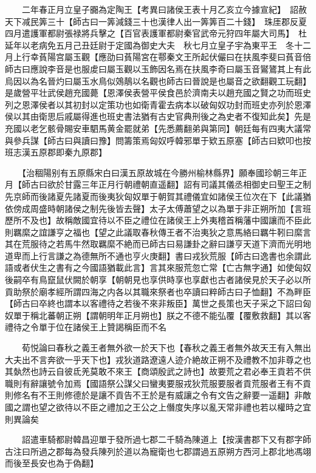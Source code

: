 　　二年春正月立皇子嚻為定陶王【考異曰諸侯王表十月乙亥立今據宣紀】　詔赦天下减民筭三十【師古曰一筭減錢三十也漢律人出一筭筭百二十錢】　珠厓郡反夏四月遣護軍都尉張禄將兵擊之【百官表護軍都尉秦官武帝元狩四年屬大司馬】　杜延年以老病免五月己丑廷尉于定國為御史大夫　秋七月立皇子宇為東平王　冬十二月上行幸萯陽宫屬玉觀【應劭曰萯陽宮在鄠秦文王所起伏儼曰在扶風李斐曰萯音倍師古曰應說李音是也服䖍曰屬玉觀以玉飾因名焉在扶風李奇曰屬玉音鸑鷟其上有此烏因以為名晉灼曰屬玉水鳥似鵁鶄以名觀也師古曰晉說是也屬音之欲翻觀工玩翻】　是歲營平壮武侯趙充國薨【恩澤侯表營平侯食邑於濟南夫以趙充國之賢之功而班史列之恩澤侯者以其初封以定策功也如衛青霍去病本以破匈奴功封而班史亦列於恩澤侯以其由衛思后戚屬得進也班史書法猶有古史官典刑後之為史者不復知此矣】先是充國以老乞骸骨賜安車駟馬黄金罷就弟【先悉薦翻弟與第同】朝廷每有四夷大議常與參兵謀【師古曰與讀曰豫】問籌策焉匈奴呼韓邪單于欵五原塞【師古曰欵叩也按班志漢五原郡即秦九原郡】

　　【治稒陽别有五原縣宋白曰漢五原故城在今勝州榆林縣界】願奉國珍朝三年正月【師古曰欲於甘露三年正月行朝禮朝直遥翻】詔有司議其儀丞相御史曰聖王之制先京師而後諸夏先諸夏而後夷狄匈奴單于朝賀其禮儀宜如諸侯王位次在下【此議猶依傍成周盛時朝諸侯之制先後皆去聲】太子太傅蕭望之以為單于非正朔所加【言班歷所不及也】故稱敵國宜待以不臣之禮位在諸侯王上外夷稽首稱藩中國讓而不臣此則羈縻之誼謙亨之福也【望之此議取春秋傳王者不治夷狄之意馬絡曰羈牛靷曰縻言其在荒服待之若馬牛然取羈縻不絶而已師古曰易謙卦之辭曰謙亨天道下濟而光明地道卑而上行言謙之為德無所不通也亨火庚翻】書曰戎狄荒服【師古曰逸書也余謂此語或者伏生之書有之今國語猶載此言】言其來服荒忽亡常【亡古無字通】如使匈奴後嗣卒有鳥竄鼠伏闕於朝享【朝朝見也享供時享也享獻也古者諸侯見於天子必以所貢助祭於廟孝經所謂四海之内各以其職來祭者也卒讀曰粹師古曰子恤翻】不為畔臣【師古曰卒終也謂本以客禮待之若後不來非叛臣】萬世之長策也天子采之下詔曰匈奴單于稱北蕃朝正朔【謂朝明年正月朔也】朕之不德不能弘覆【覆敷救翻】其以客禮待之令單于位在諸侯王上贊謁稱臣而不名

　　荀悦論曰春秋之義王者無外欲一於天下也【春秋之義王者無外故天王有入無出大夫出不言奔欲一乎天下也】戎狄道路遼遠人迹介絶故正朔不及禮教不加非尊之也其埶然也詩云自彼氐羌莫敢不來王【商頌殷武之詩也】故要荒之君必奉王貢若不供職則有辭讓號令加焉【國語祭公謀父曰蠻夷要服戎狄荒服要服者貢荒服者王有不貢則修名有不王則修德於是讓不貢告不王於是有威讓之令有文告之辭要一遥翻】非敵國之謂也望之欲待以不臣之禮加之王公之上僭度失序以亂天常非禮也若以權時之宜則異論矣

　　詔遣車騎都尉韓昌迎單于發所過七郡二千騎為陳道上【按漢書郡下又有郡字師古注曰所過之郡每為發兵陳列於道以為寵衛也七郡謂過五原朔方西河上郡北地馮翊而後至長安也為于偽翻】


